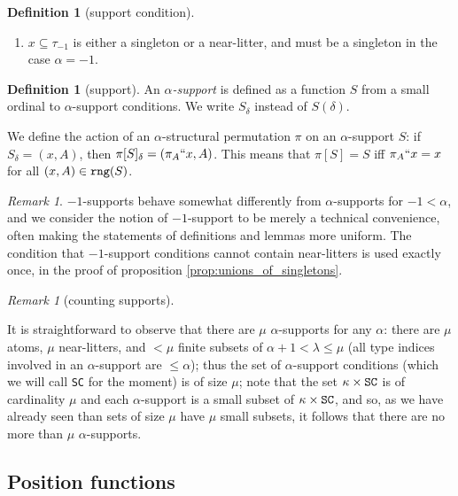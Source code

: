 \documentclass{article}
\theoremstyle{definition}
\newtheorem{definition}[theorem]{Definition}
\theoremstyle{remark}
\newtheorem{remark}[theorem]{Remark}
\begin{document}
{\begin{definition}[support condition]
\begin{enumerate}
\item $x\subseteq \tau_{-1}$ is either a singleton or a near-litter, and must be a singleton in the case $\alpha=-1$.

\end{enumerate}
\end{definition}

\begin{definition}[support]\label{def:support}
An {\em $\alpha$-support\/} is defined as a function $S$ from a small ordinal to $\alpha$-support conditions.
We write $S_\delta$ instead of $S(\delta)$.
\end{definition}

We define the action of an $\alpha$-structural permutation $\pi$ on an $\alpha$-support $S$:  if $S_\delta = (x,A)$, then $\pi[S]_\delta = (\pi_A``x,A)$.
This means that $\pi[S] = S$ iff $\pi_A``x = x$ for all $(x,A) \in {\tt rng}(S)$.

\begin{remark}
$-1$-supports behave somewhat differently from $\alpha$-supports for $-1 < \alpha$, and we consider the notion of $-1$-support to be merely a technical convenience, often making the statements of definitions and lemmas more uniform.
The condition that $-1$-support conditions cannot contain near-litters is used exactly once, in the proof of proposition \ref{prop:unions_of_singletons}.
\end{remark}

\begin{remark}[counting supports]\label{rk:counting_supports}

It is straightforward to observe that there are $\mu$ $\alpha$-supports for any $\alpha$:  there are $\mu$ atoms, $\mu$ near-litters, and
$<\mu$ finite subsets of $\alpha +1<\lambda \leq \mu$ (all type indices involved in an $\alpha$-support are $\leq \alpha$);  thus the set of $\alpha$-support conditions (which we will call {\tt SC} for the moment) is of size $\mu$;
note that the set $\kappa \times {\tt SC}$ is of cardinality $\mu$ and each $\alpha$-support is a small subset of  $\kappa \times {\tt SC}$, and so, as we have already seen than sets of size $\mu$ have $\mu$ small subsets, it follows that there are no more than $\mu$ $\alpha$-supports.

\end{remark}

\subsection{Position functions}

}
\end{document}
